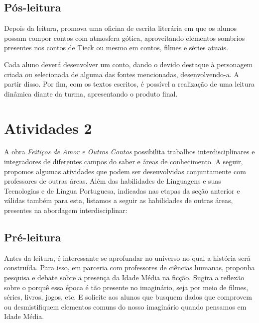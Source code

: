\documentclass[11pt]{extarticle}
\begin{document}
\subsection{Pós-leitura}


Depois da leitura, promova uma oficina de escrita literária
em que os alunos possam compor contos com atmosfera gótica, aproveitando
elementos sombrios presentes nos contos de Tieck ou mesmo em contos,
filmes e séries atuais.

Cada aluno deverá desenvolver um conto, dando o devido destaque à
personagem criada ou selecionada de alguma das fontes mencionadas,
desenvolvendo-a. A partir disso. Por fim, com os textos escritos, é
possível a realização de uma leitura dinâmica diante da turma,
apresentando o produto final.


\section{Atividades 2}


A obra \emph{Feitiços de Amor e Outros Contos} possibilita trabalhos
interdisciplinares e integradores de diferentes campos do saber e áreas
de conhecimento. A seguir, propomos algumas atividades que podem ser
desenvolvidas conjuntamente com professores de outras áreas. Além das
habilidades de Linguagens e suas Tecnologias e de Língua Portuguesa,
indicadas nas etapas da seção anterior e válidas também para esta,
listamos a seguir as habilidades de outras áreas, presentes na abordagem
interdisciplinar:

\subsection{Pré-leitura}

Antes da leitura, é interessante se aprofundar no universo
no qual a história será construída. Para isso, em parceria com
professores de ciências humanas, proponha pesquisa e debate sobre a
presença da Idade Média na ficção. Sugira a reflexão sobre o porquê essa
época é tão presente no imaginário, seja por meio de filmes, séries,
livros, jogos, etc. E solicite aos alunos que busquem dados que
comprovem ou desmistifiquem elementos comuns do nosso imaginário quando
pensamos em Idade Média.
\end{document}
